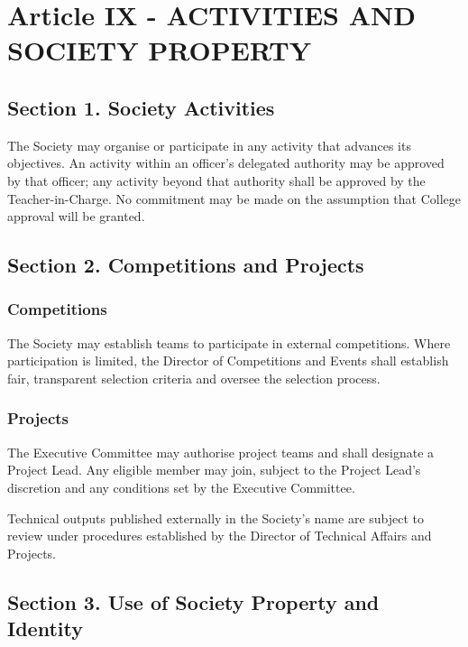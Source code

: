 \documentclass[a4paper]{article}
\begin{document}
\section*{Article IX - ACTIVITIES AND SOCIETY PROPERTY}

\subsection*{Section 1. Society Activities}
The Society may organise or participate in any activity that advances its objectives. An
activity within an officer's delegated authority may be approved by that officer; any
activity beyond that authority shall be approved by the Teacher-in-Charge. No commitment
may be made on the assumption that College approval will be granted.

\subsection*{Section 2. Competitions and Projects}
\subsubsection*{Competitions}
The Society may establish teams to participate in external competitions. Where participation is limited, the Director of Competitions and Events shall establish fair, transparent selection criteria and oversee the selection process.

\subsubsection*{Projects}
The Executive Committee may authorise project teams and shall designate a Project Lead.
Any eligible member may join, subject to the Project Lead's discretion and any conditions
set by the Executive Committee.

Technical outputs published externally in the Society's name are subject to review under
procedures established by the Director of Technical Affairs and Projects.

\subsection*{Section 3. Use of Society Property and Identity}
\end{document}
